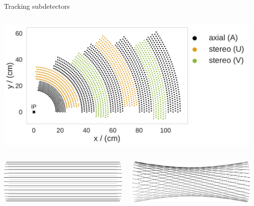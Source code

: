 \documentclass[presentation]{etp-beamer-fancy}
\begin{document}
\begin{frame}[label={sec:org169fa11}]{Tracking subdetectors}
\begin{columns}
\begin{column}{0.5\columnwidth}
\begin{center}
\includegraphics[width=.9\linewidth]{./figures/my_cdc_wire_configuration_plot.pdf}
\end{center}
\begin{columns}
\begin{column}{0.35\columnwidth}
\begin{center}
\includegraphics[width=.9\linewidth]{./figures/axial_layer_cropped.pdf}
\end{center}
\end{column}
\begin{column}{0.35\columnwidth}
\begin{center}
\includegraphics[width=.9\linewidth]{./figures/stereo_layer_hyperboloid_cropped.pdf}
\end{center}
\end{column}
\end{columns}
\end{column}

\end{columns}
\end{frame}
\end{document}
